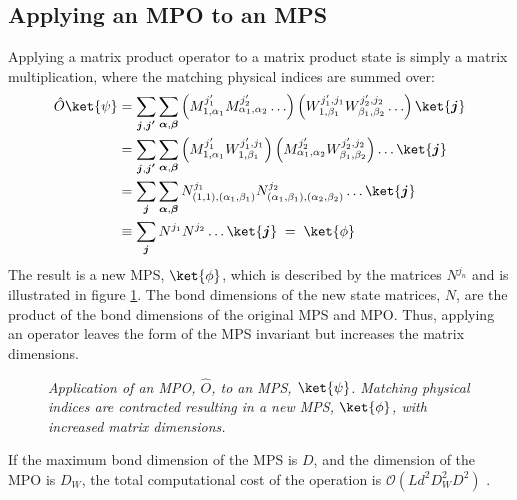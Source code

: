 \subsection{Applying an MPO to an MPS}
Applying a matrix product operator to a matrix product state is simply a matrix multiplication, where the matching physical indices are summed over:
\begin{align}
	\hat{O} \ket{\psi} &=  \sum_{\boldsymbol{j},\boldsymbol{j'}} \sum_{\boldsymbol{\alpha},\boldsymbol{\beta}} \left( M_{1, \alpha_1}^{ j_1 '} M_{\alpha_1, \alpha_2}^{j_2 '} \ldots \right) \left( W_{1, \beta_1}^{j_1 ' , j_1 } W_{\beta_1, \beta_2}^{j_2 ', j_2 } \ldots \right) \ket{\boldsymbol{j}} \nonumber \\
&= \sum_{\boldsymbol{j},\boldsymbol{j'}} \sum_{\boldsymbol{\alpha},\boldsymbol{\beta}} \left( M_{1, \alpha_1}^{ j_1 '} W_{1, \beta_1}^{j_1 ' , j_1} \right) \left( M_{\alpha_1, \alpha_2}^{j_2 '}  W_{\beta_1, \beta_2}^{j_2 ' , j_2} \right) \ldots \ket{\boldsymbol{j}} \nonumber \\
&= \sum_{\boldsymbol{j}} \sum_{\boldsymbol{\alpha},\boldsymbol{\beta}} N_{(1,1),(\alpha_1 , \beta_1)}^{j_1} N_{(\alpha_1 , \beta_1),(\alpha_2 , \beta_2)}^{j_2} \ldots \ket{\boldsymbol{j}} \nonumber \\
&\equiv \sum_{\boldsymbol{j}} N^{j_1} N^{j_2} \ldots \ket{\boldsymbol{j}} \; = \; \ket{\phi}
\label{eq:optBracketsMPO}
\end{align} 
The result is a new MPS, $\ket{\phi}$, which is described by the matrices $N^{j_n}$ and is illustrated in figure \ref{fig:MPOcont}. The bond dimensions of the new state matrices, $N$, are the product of the bond dimensions of the original MPS and MPO. Thus, applying an operator leaves the form of the MPS invariant but increases the matrix dimensions.
\begin{figure}[h!]
	\centering
	
	\caption{\textit{Application of an MPO, $\hat{O}$, to an MPS, $\ket{\psi}$. Matching physical indices are contracted resulting in a new MPS, $\ket{\phi}$, with increased matrix dimensions.}}
	\label{fig:MPOcont}
\end{figure}
If the maximum bond dimension of the MPS is $D$, and the dimension of the MPO is $D_W$, the total computational cost of the operation is $\mathcal{O}(L d^2 D_W ^2 D^2)$ \cite{schollwock, McCulloch2007}.

